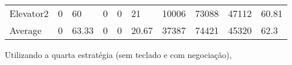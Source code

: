﻿\documentclass[a4paper]{article}
\begin{document}
\begin{table}[h]
\begin{tabular}{@{}llllllllll@{}}
Elevator2 & 0        & 60            & 0           & 0                                                               & 21                                                                  & 10006                                                         & 73088                                                 & 47112                                                   & 60.81         \\
Average   & 0     & 63.33         & 0        & 0                                                               & 20.67                                                               & 37387                                                         & 74421                                                 &  45320                                                  & 62.3         \\ \bottomrule
\end{tabular}
\end{table}

Utilizando a quarta estratégia  (sem teclado e com negociação),
\end{document}
